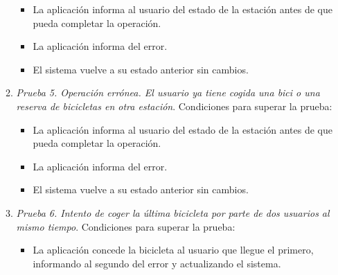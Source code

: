 \begin{itemize}
\begin{enumerate}
		\begin{itemize}
			\item La aplicación informa al usuario del estado de la estación antes de que pueda completar la operación.
			\item La aplicación informa del error.
			\item El sistema vuelve a su estado anterior sin cambios.
		\end{itemize}
		\item \textit{Prueba 5. Operación errónea. El usuario ya tiene cogida una bici o una reserva de bicicletas en otra estación}. Condiciones para superar la prueba:
		\begin{itemize}
			\item La aplicación informa al usuario del estado de la estación antes de que pueda completar la operación.
			\item La aplicación informa del error.
			\item El sistema vuelve a su estado anterior sin cambios.
		\end{itemize}
		\item \textit{Prueba 6. Intento de coger la última bicicleta por parte de dos usuarios al mismo tiempo}. Condiciones para superar la prueba:
		\begin{itemize}
			\item La aplicación concede la bicicleta al usuario que llegue el primero, informando al segundo del error y actualizando el sistema.
		\end{itemize}
	\end{enumerate}
	

\end{itemize}
